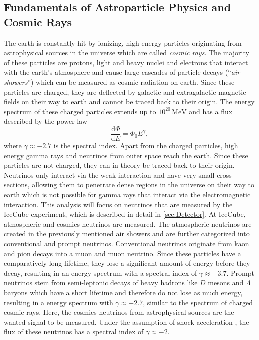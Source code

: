 \subsection{Fundamentals of Astroparticle Physics and Cosmic Rays}
The earth is constantly hit by ionizing, high energy particles originating from astrophysical sources in the universe which are called \textit{cosmic rays}. 
The majority of these particles are protons, light and heavy nuclei and electrons that interact with the earth's atmosphere and cause large cascades of particle decays 
(\enquote{\textit{air showers}})
which can be measured as cosmic radiation on earth. Since these particles are charged, they are deflected by galactic and extragalactic magnetic fields on their way to earth and 
cannot be traced back to their origin. The energy spectrum of these charged particles extends up to $10^{20}\, \unit{\mega\eV}$ and has a flux described by the power law 
\begin{equation}
    \frac{\mathrm{d}\Phi}{\mathrm{d}E} = \Phi_0 E^\gamma,
    \label{eq:flux}
\end{equation}
where $\gamma \approx \num{-2.7}$ is the spectral index.
Apart from the charged particles, high energy gamma rays and neutrinos from outer space reach the earth. Since these particles are not charged, they can in theory be 
traced back to their origin. Neutrinos only interact via the weak interaction and have very small cross sections, allowing them to penetrate dense regions in the universe on 
their way to earth which is not possible for gamma rays that interact via the electromagnetic interaction.
This analysis will focus on neutrinos that are measured by the IceCube experiment, which is described in detail in \autoref{sec:Detector}.
At IceCube, atmospheric and cosmics neutrinos are measured. The atmospheric neutrinos are created in the previously mentioned air showers and are further categorized into 
conventional and prompt neutrinos. Conventional neutrinos originate from kaon and pion decays into a muon and muon neutrino. Since these particles have a comparatively long
lifetime, they lose a significant amount of energy before they decay, resulting in an energy spectrum with a spectral index of $\gamma \approx \num{-3.7}$. 
Prompt neutrinos stem from semi-leptonic decays of heavy hadrons like $D$ mesons and $\Lambda$ baryons which have a short lifetime and therefore do not lose as much energy,
resulting in a energy spectrum with $\gamma \approx \num{-2.7}$, similar to the spectrum of charged cosmic rays. Here, the cosmics neutrinos from astrophysical sources are the wanted signal to be measured. 
Under the assumption of shock acceleration \cite{Fermi1949}, the flux of these neutrinos has a spectral index of $\gamma \approx \num{-2}$.

